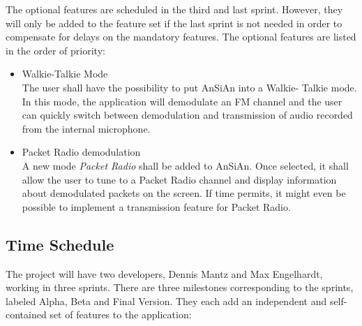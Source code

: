 The optional features are scheduled in the third and last sprint. However,
they will only be added to the feature set if the last sprint is not needed
in order to compensate for delays on the mandatory features. The optional features are
listed in the order of priority:
\begin{itemize}
	\item Walkie-Talkie Mode \\
		The user shall have the possibility to put AnSiAn into a Walkie-
		Talkie mode. In this mode, the application will demodulate an FM channel
		and the user can quickly switch between demodulation and transmission
		of audio recorded from the internal microphone.
	\item Packet Radio demodulation\\
		A new mode \emph{Packet Radio} shall be added to AnSiAn. Once selected, it shall allow the user
		to tune to a Packet Radio channel and display information about 
		demodulated packets on the screen. If time permits, it might even
		be possible to implement a transmission feature for Packet Radio.
\end{itemize}


\subsection{Time Schedule}
\label{sec:time_schedule}

The project will have two developers, Dennis Mantz and Max Engelhardt,
working in three sprints. There are three milestones corresponding to
the sprints, labeled Alpha, Beta and Final Version. They each add an independent
and self-contained set of features to the application:

